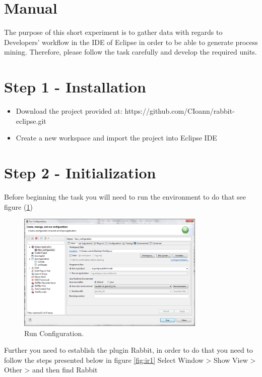 \section{Manual}

The purpose of this short experiment is to gather data with regards to Developers' workflow in the IDE of Eclipse in order to be able to generate process mining. Therefore, please follow the task carefully and develop the required units. 


\section{Step 1 - Installation}

\begin{itemize}
	\item Download the project provided at: https://github.com/CIoann/rabbit-eclipse.git
	\item Create a new workspace and import the project into Eclipse IDE
\end{itemize}

\section{Step 2 - Initialization} 
Before beginning the task you will need to run the environment to do that see figure (\ref{fig:rc})

\begin{figure}[!ht]
		\begin{center}		 	
			\includegraphics[width=0.8\textwidth]{figures/runconfig.png}
		\end{center}
		\caption{Run Configuration.}
		\label{fig:rc}
	\end{figure}

Further you need to establish the plugin Rabbit, in order to do that you need to follow the steps presented below in figure \ref{fig:ir1} Select Window > Show View > Other > and then find Rabbit

